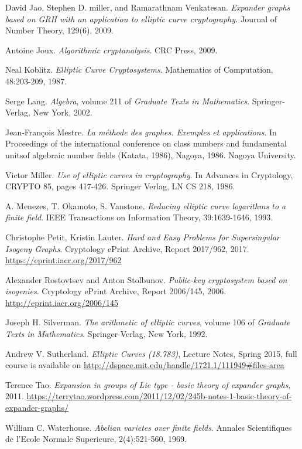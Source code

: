 \documentclass{article}
\theoremstyle{theorem}
\theoremstyle{definition}
\begin{document}
\begin{thebibliography}{}
	 David Jao, Stephen D. miller, and Ramarathnam Venkatesan. \textit{Expander graphs based on GRH with an application to elliptic curve cryptography.} Journal of Number Theory, 129(6), 2009.
	
	 Antoine Joux. \textit{Algorithmic cryptanalysis}. CRC Press, 2009.
	
	 Neal Koblitz. \textit{Elliptic Curve Cryptosystems}. Mathematics of Computation, 48:203-209, 1987.
	
	 Serge Lang. \textit{Algebra}, volume 211 of \textit{Graduate Texts in Mathematics}. Springer-Verlag, New York, 2002.

	 Jean-François Mestre. \textit{La méthode des graphes. Exemples et applications}. In Proceedings of the international conference on class numbers and fundamental unitsof algebraic number fields (Katata, 1986), Nagoya, 1986. Nagoya University.
	
	 Victor Miller. \textit{Use of elliptic curves in cryptography}. In Advances in Cryptology, CRYPTO 85, pages 417-426. Springer Verlag, LN CS 218, 1986.
	
	 A. Menezes, T. Okamoto, S. Vanstone. \textit{Reducing elliptic curve logarithms to a finite field}. IEEE Transactions on Information Theory, 39:1639-1646, 1993.
	
	 Christophe Petit, Kristin Lauter. \textit{Hard and Easy Problems for Supersingular Isogeny Graphs}. Cryptology ePrint Archive, Report 2017/962, 2017. \url{https://eprint.iacr.org/2017/962}
	
	 Alexander Rostovtsev and Anton Stolbunov. \textit{Public-key cryptosystem based on isogenies}. Cryptology ePrint Archive, Report 2006/145, 2006. \url{http://eprint.iacr.org/2006/145}
	
	 Joseph H. Silverman. \textit{The arithmetic of elliptic curves}, volume 106 of \textit{Graduate Texts in Mathematics}. Springer-Verlag, New York, 1992.

	 Andrew V. Sutherland. \textit{  Elliptic Curves (18.783)}, Lecture Notes, Spring 2015, full course is available on \url{http://dspace.mit.edu/handle/1721.1/111949#files-area}
	
	 Terence Tao. \textit{Expansion in groups of Lie type  - basic theory of expander graphs}, 2011. \url{https://terrytao.wordpress.com/2011/12/02/245b-notes-1-basic-theory-of-expander-graphs/}
	
	 William C. Waterhouse. \textit{Abelian varietes over finite fields}. Annales Scientifiques de l'Ecole Normale Superieure, 2(4):521-560, 1969.
	
	
\end{thebibliography}
\end{document}
